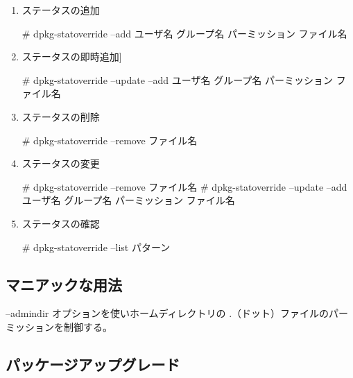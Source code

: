 \documentclass[mingoth,a4paper]{jsarticle}
\begin{document}
  \begin{enumerate}
  \item ステータスの追加

    \# dpkg-statoverride --add ユーザ名 グループ名 パーミッション ファイル名

  \item ステータスの即時追加]
  
    \# dpkg-statoverride --update --add ユーザ名 グループ名 パーミッション ファイル名

  \item ステータスの削除

    \# dpkg-statoverride --remove ファイル名   

  \item ステータスの変更 

     \# dpkg-statoverride --remove ファイル名 
     \# dpkg-statoverride --update --add ユーザ名 グループ名 パーミッション ファイル名

  \item ステータスの確認
     
     \# dpkg-statoverride --list パターン

  \end{enumerate}


  \subsection{マニアックな用法}

  --admindir オプションを使いホームディレクトリの .（ドット）ファイルのパーミッションを制御する。

  \subsection{パッケージアップグレード}
\end{document}
